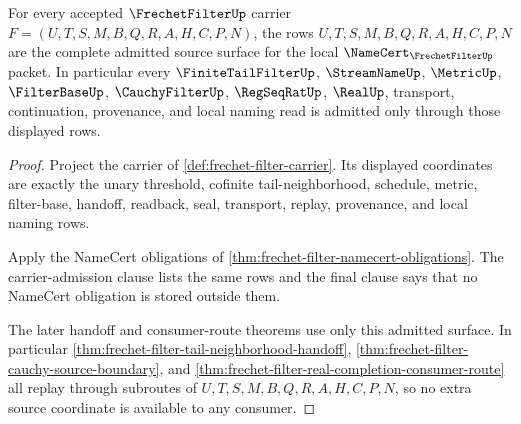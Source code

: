 \begin{theorem}
\label{thm:frechet-filter-carrier-admission-obligation}
For every accepted $\FrechetFilterUp$ carrier $F=(U,T,S,M,B,Q,R,A,H,C,P,N)$, the rows $U,T,S,M,B,Q,R,A,H,C,P,N$ are the complete admitted source surface for the local $\NameCert_{\FrechetFilterUp}$ packet. In particular every $\FiniteTailFilterUp$, $\StreamNameUp$, $\MetricUp$, $\FilterBaseUp$, $\CauchyFilterUp$, $\RegSeqRatUp$, $\RealUp$, transport, continuation, provenance, and local naming read is admitted only through those displayed rows.
\end{theorem}
\begin{proof}
Project the carrier of \autoref{def:frechet-filter-carrier}. Its displayed coordinates are exactly the unary threshold, cofinite tail-neighborhood, schedule, metric, filter-base, handoff, readback, seal, transport, replay, provenance, and local naming rows.

Apply the NameCert obligations of \autoref{thm:frechet-filter-namecert-obligations}. The carrier-admission clause lists the same rows and the final clause says that no NameCert obligation is stored outside them.

The later handoff and consumer-route theorems use only this admitted surface. In particular \autoref{thm:frechet-filter-tail-neighborhood-handoff}, \autoref{thm:frechet-filter-cauchy-source-boundary}, and \autoref{thm:frechet-filter-real-completion-consumer-route} all replay through subroutes of $U,T,S,M,B,Q,R,A,H,C,P,N$, so no extra source coordinate is available to any consumer.
\end{proof}

